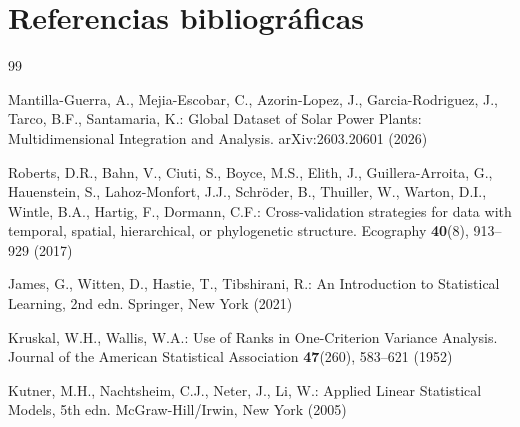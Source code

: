 \documentclass[pdflatex,sn-mathphys-num]{sn-jnl}
\begin{document}
\section*{Referencias bibliográficas}

\begin{thebibliography}{99}

 Mantilla-Guerra, A., Mejia-Escobar, C., Azorin-Lopez, J., Garcia-Rodriguez, J., Tarco, B.F., Santamaria, K.: Global Dataset of Solar Power Plants: Multidimensional Integration and Analysis. arXiv:2603.20601 (2026)

 Roberts, D.R., Bahn, V., Ciuti, S., Boyce, M.S., Elith, J., Guillera-Arroita, G., Hauenstein, S., Lahoz-Monfort, J.J., Schröder, B., Thuiller, W., Warton, D.I., Wintle, B.A., Hartig, F., Dormann, C.F.: Cross-validation strategies for data with temporal, spatial, hierarchical, or phylogenetic structure. Ecography \textbf{40}(8), 913--929 (2017)

 James, G., Witten, D., Hastie, T., Tibshirani, R.: An Introduction to Statistical Learning, 2nd edn. Springer, New York (2021)

 Kruskal, W.H., Wallis, W.A.: Use of Ranks in One-Criterion Variance Analysis. Journal of the American Statistical Association \textbf{47}(260), 583--621 (1952)

 Kutner, M.H., Nachtsheim, C.J., Neter, J., Li, W.: Applied Linear Statistical Models, 5th edn. McGraw-Hill/Irwin, New York (2005)

\end{thebibliography}
\end{document}
